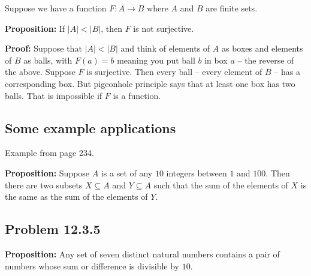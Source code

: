 \documentclass[
]{article}
\begin{document}
Suppose we have a function \(F:A\to B\) where \(A\) and \(B\) are finite
sets.

\textbf{Proposition:} If \(|A|<|B|\), then \(F\) is not surjective.

\textbf{Proof:} Suppose that \(|A|<|B|\) and think of elements of \(A\)
as boxes and elements of \(B\) as balls, with \(F(a)=b\) meaning you put
ball \(b\) in box \(a\) -- the reverse of the above. Suppose \(F\) is
surjective. Then every ball -- every element of \(B\) -- has a
corresponding box. But pigeonhole principle says that at least one box
has two balls. That is impossible if \(F\) is a function.

\vfill\eject

\hypertarget{some-example-applications}{%
\subsection{Some example applications}\label{some-example-applications}}

Example from page 234.

\textbf{Proposition:} Suppose \(A\) is a set of any \(10\) integers
between \(1\) and \(100\). Then there are two subsets \(X\subseteq A\)
and \(Y\subseteq A\) such that the sum of the elements of \(X\) is the
same as the sum of the elements of \(Y\).

\vfill\eject

\hypertarget{problem-12.3.5}{%
\subsection{Problem 12.3.5}\label{problem-12.3.5}}

\textbf{Proposition:} Any set of seven distinct natural numbers contains
a pair of numbers whose sum or difference is divisible by \(10\).
\end{document}
